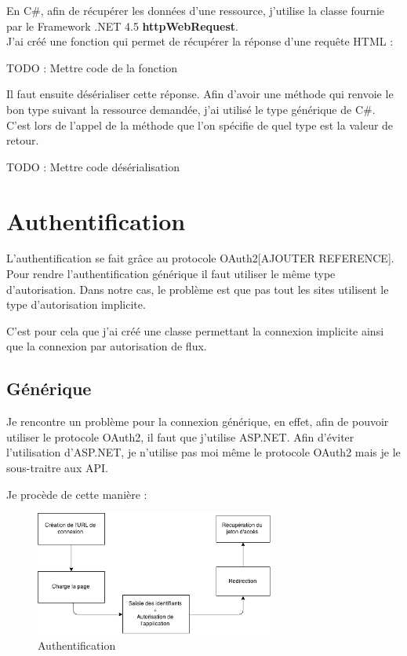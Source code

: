 \documentclass[11pt]{report} %
\begin{document}
		En C\#, afin de récupérer les données d'une ressource, j'utilise la classe fournie par le Framework .NET 4.5 \textbf{httpWebRequest}.\\		
		J'ai créé une fonction qui permet de récupérer la réponse d'une requête HTML :
		
		TODO : Mettre code de la fonction
		
		Il faut ensuite désérialiser cette réponse. Afin d’avoir une méthode qui renvoie le bon type suivant la ressource demandée, j’ai utilisé le type générique de C\#. C'est lors de l'appel de la méthode que l'on spécifie de quel type est la valeur de retour.
		
		TODO : Mettre code désérialisation 
		
	
	\section{Authentification}
	L'authentification se fait grâce au protocole OAuth2[AJOUTER REFERENCE]. Pour rendre l'authentification générique il faut utiliser le même type d'autorisation. Dans notre cas, le problème est que pas tout les sites utilisent le type d'autorisation implicite.
	
	C'est pour cela que j'ai créé une classe permettant la connexion implicite ainsi que la connexion par autorisation de flux.
	
	\subsection{Générique}
	Je rencontre un problème pour la connexion générique, en effet, afin de pouvoir utiliser le protocole OAuth2, il faut que j'utilise ASP.NET. 
	Afin d'éviter l'utilisation d'ASP.NET, je n'utilise pas moi même le protocole OAuth2 mais je le sous-traitre aux API.
	
	Je procède de cette manière :
	
			\begin{figure}[h]
				\center
				\includegraphics[width=0.7\textwidth]{../img/auth.png}
				\caption{Authentification}
				\label{authentification}
			\end{figure}
	
\end{document}
